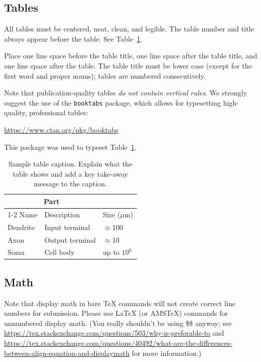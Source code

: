 \documentclass{article}
\begin{document}
\subsection{Tables}


All tables must be centered, neat, clean, and legible.  The table number and
title always appear before the table.  See Table~\ref{sample-table}.


Place one line space before the table title, one line space after the
table title, and one line space after the table. The table title must
be lower case (except for the first word and proper nouns); tables are
numbered consecutively.


Note that publication-quality tables \emph{do not contain vertical rules}. We
strongly suggest the use of the \verb+booktabs+ package, which allows for
typesetting high-quality, professional tables:
\begin{center}
  \url{https://www.ctan.org/pkg/booktabs}
\end{center}
This package was used to typeset Table~\ref{sample-table}.


\begin{table}
  \caption{Sample table caption. Explain what the table shows and add a key take-away message to the caption.}
  \label{sample-table}
  \centering
  \begin{tabular}{lll}
    \toprule
    \multicolumn{2}{c}{Part}                   \\
    \cmidrule(r){1-2}
    Name     & Description     & Size ($\mu$m) \\
    \midrule
    Dendrite & Input terminal  & $\approx$100     \\
    Axon     & Output terminal & $\approx$10      \\
    Soma     & Cell body       & up to $10^6$  \\
    \bottomrule
  \end{tabular}
\end{table}

\subsection{Math}
Note that display math in bare TeX commands will not create correct line numbers for submission. Please use LaTeX (or AMSTeX) commands for unnumbered display math. (You really shouldn't be using \$\$ anyway; see \url{https://tex.stackexchange.com/questions/503/why-is-preferable-to} and \url{https://tex.stackexchange.com/questions/40492/what-are-the-differences-between-align-equation-and-displaymath} for more information.)
\end{document}
